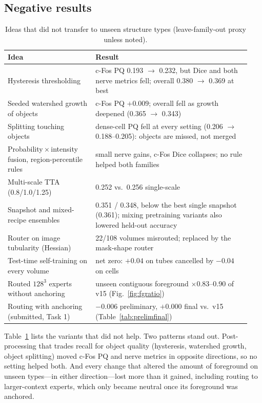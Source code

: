 \documentclass[11pt,a4paper]{article}
\newcommand{\x}{\ensuremath{\times}}
\begin{document}
\subsection{Negative results}

\begin{table}[!htbp]
\centering\small
\caption{Ideas that did not transfer to unseen structure types (leave-family-out proxy unless noted).}
\label{tab:neg}
\begin{tabular}{p{0.34\linewidth}p{0.6\linewidth}}
\toprule
Idea & Result \\
\midrule
Hysteresis thresholding & c-Fos PQ 0.193 $\to$ 0.232, but Dice and both nerve metrics fell; overall 0.380 $\to$ 0.369 at best \\
Seeded watershed growth of objects & c-Fos PQ $+0.009$; overall fell as growth deepened (0.365 $\to$ 0.343) \\
Splitting touching objects & dense-cell PQ fell at every setting (0.206 $\to$ 0.188--0.205): objects are missed, not merged \\
Probability\,$\times$\,intensity fusion, region-percentile rules & small nerve gains, c-Fos Dice collapses; no rule helped both families \\
Multi-scale TTA (0.8/1.0/1.25) & 0.252 vs.\ 0.256 single-scale \\
Snapshot and mixed-recipe ensembles & 0.351 / 0.348, below the best single snapshot (0.361); mixing pretraining variants also lowered held-out accuracy \\
Router on image tubularity (Hessian) & 22/108 volumes misrouted; replaced by the mask-shape router \\
Test-time self-training on every volume & net zero: $+0.04$ on tubes cancelled by $-0.04$ on cells \\
Routed $128^3$ experts without anchoring & unseen contiguous foreground \x0.83--0.90 of v15 (Fig.~\ref{fig:fgratio}) \\
Routing with anchoring (submitted, Task 1) & $-0.006$ preliminary, $+0.000$ final vs.\ v15 (Table~\ref{tab:prelimfinal}) \\
\bottomrule
\end{tabular}
\end{table}

Table~\ref{tab:neg} lists the variants that did not help. Two patterns stand out. Post-processing that trades recall for object quality (hysteresis, watershed growth, object splitting) moved c-Fos PQ and nerve metrics in opposite directions, so no setting helped both. And every change that altered the amount of foreground on unseen types---in either direction---lost more than it gained, including routing to larger-context experts, which only became neutral once its foreground was anchored.
\end{document}

